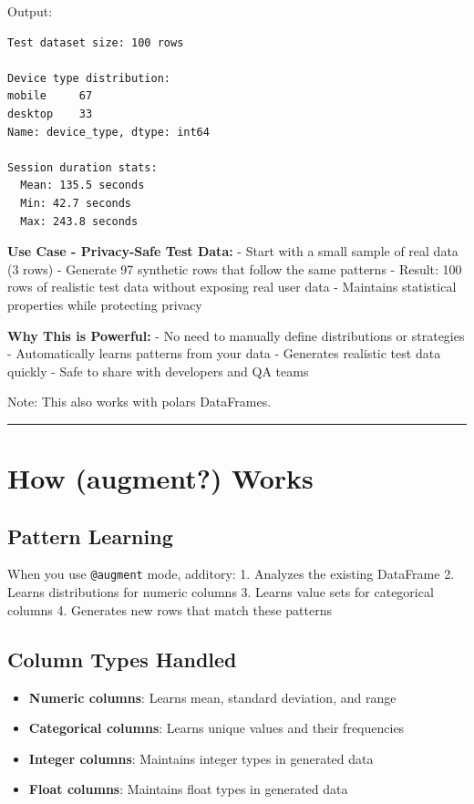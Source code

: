\documentclass[
  letterpaper,
]{scrbook}
\providecommand{\tightlist}{%
  \setlength{\itemsep}{0pt}\setlength{\parskip}{0pt}}
\begin{document}
Output:

\begin{verbatim}
Test dataset size: 100 rows

Device type distribution:
mobile     67
desktop    33
Name: device_type, dtype: int64

Session duration stats:
  Mean: 135.5 seconds
  Min: 42.7 seconds
  Max: 243.8 seconds
\end{verbatim}

\textbf{Use Case - Privacy-Safe Test Data:} - Start with a small sample
of real data (3 rows) - Generate 97 synthetic rows that follow the same
patterns - Result: 100 rows of realistic test data without exposing real
user data - Maintains statistical properties while protecting privacy

\textbf{Why This is Powerful:} - No need to manually define
distributions or strategies - Automatically learns patterns from your
data - Generates realistic test data quickly - Safe to share with
developers and QA teams

Note: This also works with polars DataFrames.

\begin{center}\rule{0.5\linewidth}{0.5pt}\end{center}

\section{\texorpdfstring{How (\textbf{augment?})
Works}{How (augment?) Works}}\label{how-augment-works}

\subsection{Pattern Learning}\label{pattern-learning}

When you use \texttt{@augment} mode, additory: 1. Analyzes the existing
DataFrame 2. Learns distributions for numeric columns 3. Learns value
sets for categorical columns 4. Generates new rows that match these
patterns

\subsection{Column Types Handled}\label{column-types-handled}

\begin{itemize}
\tightlist
\item
  \textbf{Numeric columns}: Learns mean, standard deviation, and range
\item
  \textbf{Categorical columns}: Learns unique values and their
  frequencies
\item
  \textbf{Integer columns}: Maintains integer types in generated data
\item
  \textbf{Float columns}: Maintains float types in generated data
\end{itemize}
\end{document}
